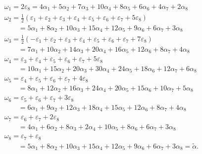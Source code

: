 \[
\begin{array}{l} \omega_ {1} = 2 \varepsilon_ {8} = 4 \alpha_ {1} + 5 \alpha_ {2} + 7 \alpha_ {3} + 10 \alpha_ {4} + 8 \alpha_ {5} + 6 \alpha_ {6} + 4 \alpha_ {7} + 2 \alpha_ {8} \\ \omega_ {2} = \frac {1}{2} (\varepsilon_ {1} + \varepsilon_ {2} + \varepsilon_ {3} + \varepsilon_ {4} + \varepsilon_ {5} + \varepsilon_ {6} + \varepsilon_ {7} + 5 \varepsilon_ {8}) \\ \qquad = 5 \alpha_ {1} + 8 \alpha_ {2} + 10 \alpha_ {3} + 15 \alpha_ {4} + 12 \alpha_ {5} + 9 \alpha_ {6} + 6 \alpha_ {7} + 3 \alpha_ {8} \\ \omega_ {3} = \frac {1}{2} (- \varepsilon_ {1} + \varepsilon_ {2} + \varepsilon_ {3} + \varepsilon_ {4} + \varepsilon_ {5} + \varepsilon_ {6} + \varepsilon_ {7} + 7 \varepsilon_ {8}) \\ \qquad = 7 \alpha_ {1} + 10 \alpha_ {2} + 14 \alpha_ {3} + 20 \alpha_ {4} + 16 \alpha_ {5} + 12 \alpha_ {6} + 8 \alpha_ {7} + 4 \alpha_ {8} \\ \omega_ {4} = \varepsilon_ {3} + \varepsilon_ {4} + \varepsilon_ {5} + \varepsilon_ {6} + \varepsilon_ {7} + 5 \varepsilon_ {8} \\ \qquad = 10 \alpha_ {1} + 15 \alpha_ {2} + 20 \alpha_ {3} + 30 \alpha_ {4} + 24 \alpha_ {5} + 18 \alpha_ {6} + 12 \alpha_ {7} + 6 \alpha_ {8} \\ \omega_ {5} = \varepsilon_ {4} + \varepsilon_ {5} + \varepsilon_ {6} + \varepsilon_ {7} + 4 \varepsilon_ {8} \\ \qquad = 8 \alpha_ {1} + 12 \alpha_ {2} + 16 \alpha_ {3} + 24 \alpha_ {4} + 20 \alpha_ {5} + 15 \alpha_ {6} + 10 \alpha_ {7} + 5 \alpha_ {8} \\ \omega_ {6} = \varepsilon_ {5} + \varepsilon_ {6} + \varepsilon_ {7} + 3 \varepsilon_ {8} \\ \qquad = 6 \alpha_ {1} + 9 \alpha_ {2} + 12 \alpha_ {3} + 18 \alpha_ {4} + 15 \alpha_ {5} + 12 \alpha_ {6} + 8 \alpha_ {7} + 4 \alpha_ {8} \\ \omega_ {7} = \varepsilon_ {6} + \varepsilon_ {7} + 2 \varepsilon_ {8} \\ \qquad = 4 \alpha_ {1} + 6 \alpha_ {2} + 8 \alpha_ {3} + 2 \alpha_ {4} + 10 \alpha_ {5} + 8 \alpha_ {6} + 6 \alpha_ {7} + 3 \alpha_ {8} \\ \omega_ {8} = \varepsilon_ {7} + \varepsilon_ {8} \\ \qquad = 5 \alpha_ {1} + 8 \alpha_ {2} + 10 \alpha_ {3} + 15 \alpha_ {4} + 12 \alpha_ {5} + 9 \alpha_ {6} + 6 \alpha_ {7} + 3 \alpha_ {8} = \tilde {\alpha}. \end{array}
\]

